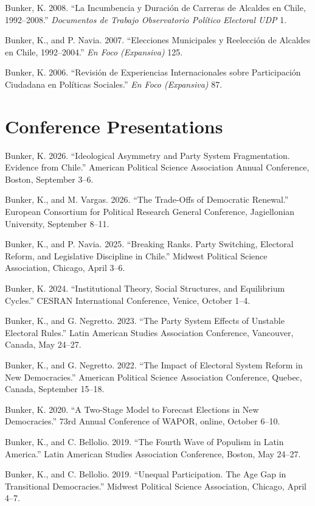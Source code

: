\documentclass[11pt,letterpaper]{article}
\newif\ifafterhead
\newlength{\entrygap}\setlength{\entrygap}{8.5pt}
\newcommand{\gap}{\ifafterhead\global\afterheadfalse\else\vspace{\entrygap}\fi}
\newcommand{\entry}[1]{\par\gap\hangindent=13pt\hangafter=1\noindent #1\par}
\begin{document}
\entry{Bunker, K. 2008. ``La Incumbencia y Duración de Carreras de Alcaldes en Chile, 1992--2008.'' \textit{Documentos de Trabajo Observatorio Político Electoral UDP} 1.}

\entry{Bunker, K., and P. Navia. 2007. ``Elecciones Municipales y Reelección de Alcaldes en Chile, 1992--2004.'' \textit{En Foco (Expansiva)} 125.}

\entry{Bunker, K. 2006. ``Revisión de Experiencias Internacionales sobre Participación Ciudadana en Políticas Sociales.'' \textit{En Foco (Expansiva)} 87.}

\section{Conference Presentations}
\entry{Bunker, K. 2026. ``Ideological Asymmetry and Party System Fragmentation. Evidence from Chile.'' American Political Science Association Annual Conference, Boston, September 3--6.}

\entry{Bunker, K., and M. Vargas. 2026. ``The Trade-Offs of Democratic Renewal.'' European Consortium for Political Research General Conference, Jagiellonian University, September 8--11.}

\entry{Bunker, K., and P. Navia. 2025. ``Breaking Ranks. Party Switching, Electoral Reform, and Legislative Discipline in Chile.'' Midwest Political Science Association, Chicago, April 3--6.}

\entry{Bunker, K. 2024. ``Institutional Theory, Social Structures, and Equilibrium Cycles.'' CESRAN International Conference, Venice, October 1--4.}

\entry{Bunker, K., and G. Negretto. 2023. ``The Party System Effects of Unstable Electoral Rules.'' Latin American Studies Association Conference, Vancouver, Canada, May 24--27.}

\entry{Bunker, K., and G. Negretto. 2022. ``The Impact of Electoral System Reform in New Democracies.'' American Political Science Association Conference, Quebec, Canada, September 15--18.}

\entry{Bunker, K. 2020. ``A Two-Stage Model to Forecast Elections in New Democracies.'' 73rd Annual Conference of WAPOR, online, October 6--10.}

\entry{Bunker, K., and C. Bellolio. 2019. ``The Fourth Wave of Populism in Latin America.'' Latin American Studies Association Conference, Boston, May 24--27.}

\entry{Bunker, K., and C. Bellolio. 2019. ``Unequal Participation. The Age Gap in Transitional Democracies.'' Midwest Political Science Association, Chicago, April 4--7.}
\end{document}
